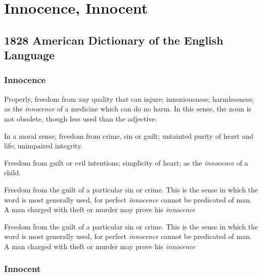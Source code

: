 \section{Innocence, Innocent}
	\label{INNOCENCE}
	

\subsection{1828 American Dictionary of the English Language} %
	\label{INNOCENCE-1828}
	
	\subsubsection{Innocence}

		\begin{compactitem}
			\item[1] Properly, freedom from any quality that can injure; innoxiousness; harmlessness; as the \textit{innocence} of a medicine which can do no harm. In this sense, the noun is not obsolete, though less used than the adjective.
			\item[2] In a moral sense, freedom from crime, sin or guilt; untainted purity of heart and life; unimpaired integrity.
			\item[3] Freedom from guilt or evil intentions; simplicity of heart; as the \textit{innocence} of a child.
			\item[4] Freedom from the guilt of a particular sin or crime. This is the sense in which the word is most generally used, for perfect \textit{innocence} cannot be predicated of man. A man charged with theft or murder may prove his \textit{innocence}
			\item[5] Freedom from the guilt of a particular sin or crime. This is the sense in which the word is most generally used, for perfect \textit{innocence} cannot be predicated of man. A man charged with theft or murder may prove his \textit{innocence}
		\end{compactitem}
		
	\subsubsection{Innocent}

